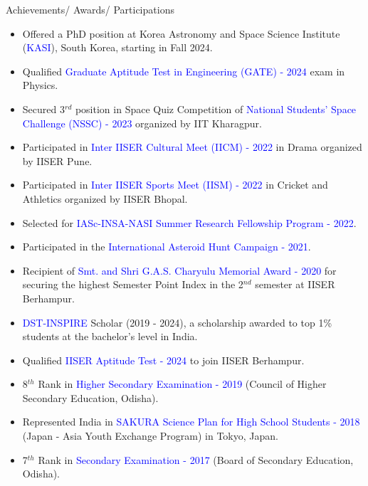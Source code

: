 \documentclass{resume} %
\begin{document}
\begin{rSection}{Achievements/ Awards/ Participations}
\begin{itemize}
\itemsep -3pt
    \item Offered a PhD position at Korea Astronomy and Space Science Institute (\textcolor{blue}{KASI}), South Korea, starting in Fall 2024.
    \item Qualified \textcolor{blue}{Graduate Aptitude Test in Engineering (GATE) - 2024} exam in Physics.
    \item Secured 3$^{rd}$ position in Space Quiz Competition of \textcolor{blue}{National Students' Space Challenge (NSSC) - 2023} organized by IIT Kharagpur.
    \item Participated in \textcolor{blue}{Inter IISER Cultural Meet (IICM) - 2022} in Drama organized by IISER Pune.
    \item Participated in \textcolor{blue}{Inter IISER Sports Meet (IISM) - 2022} in Cricket and Athletics organized by IISER Bhopal.
    \item Selected for \textcolor{blue}{IASc-INSA-NASI Summer Research Fellowship Program - 2022}.
    \item Participated in the \textcolor{blue}{International Asteroid Hunt Campaign - 2021}.
    \item Recipient of \textcolor{blue}{Smt. and Shri G.A.S. Charyulu Memorial Award - 2020} for securing the highest Semester Point Index in the 2$^{nd}$ semester at IISER Berhampur.
    \item \textcolor{blue}{DST-INSPIRE} Scholar (2019 - 2024), a scholarship awarded to top 1\% students at the bachelor's level in India.
    \item Qualified \textcolor{blue}{IISER Aptitude Test - 2024} to join IISER Berhampur.
    \item 8$^{th}$ Rank in \textcolor{blue}{Higher Secondary Examination - 2019} (Council of Higher Secondary Education, Odisha).
    \item Represented India in \textcolor{blue}{SAKURA Science Plan for High School Students - 2018} (Japan - Asia Youth Exchange Program) in Tokyo, Japan.
    \item 7$^{th}$ Rank in \textcolor{blue}{Secondary Examination - 2017} (Board of Secondary Education, Odisha).
\end{itemize}
\end{rSection}
\end{document}
